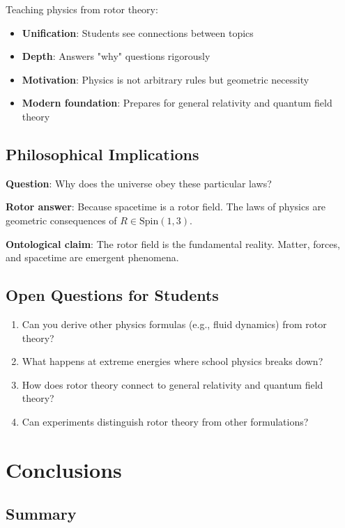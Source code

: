 \documentclass[12pt,a4paper]{article}
\theoremstyle{definition}
\theoremstyle{remark}
\begin{document}
Teaching physics from rotor theory:
\begin{itemize}
\item \textbf{Unification}: Students see connections between topics
\item \textbf{Depth}: Answers "why" questions rigorously
\item \textbf{Motivation}: Physics is not arbitrary rules but geometric necessity
\item \textbf{Modern foundation}: Prepares for general relativity and quantum field theory
\end{itemize}

\subsection{Philosophical Implications}

\textbf{Question}: Why does the universe obey these particular laws?

\textbf{Rotor answer}: Because spacetime is a rotor field. The laws of physics are geometric consequences of $R \in \mathrm{Spin}(1,3)$.

\textbf{Ontological claim}: The rotor field is the fundamental reality. Matter, forces, and spacetime are emergent phenomena.

\subsection{Open Questions for Students}

\begin{enumerate}
\item Can you derive other physics formulas (e.g., fluid dynamics) from rotor theory?
\item What happens at extreme energies where school physics breaks down?
\item How does rotor theory connect to general relativity and quantum field theory?
\item Can experiments distinguish rotor theory from other formulations?
\end{enumerate}

\section{Conclusions}

\subsection{Summary}
\end{document}
